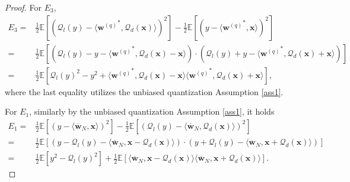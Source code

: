 \documentclass[11pt, letterpaper]{article}
\begin{document}
\begin{proof}
    For $E_3$,
    \begin{equation*}
        \begin{aligned}
            E_3=&\frac{1}{2}\mathbb{E}\left[(\mathcal{Q}_l(y)-\langle {\mathbf{w}^{(q)}}^*,\mathcal{Q}_d(\mathbf{x})\rangle)^2\right]-\frac{1}{2}\mathbb{E}\left[\left(y-\langle {\mathbf{w}^{(q)}}^*,\mathbf{x} \rangle \right)^2\right]\\
            =&\frac{1}{2}\mathbb{E}\left[\left(\mathcal{Q}_l(y)-y-\langle {\mathbf{w}^{(q)}}^*,\mathcal{Q}_d(\mathbf{x})-\mathbf{x}\rangle\right)\cdot \left(\mathcal{Q}_l(y)+y-\langle {\mathbf{w}^{(q)}}^*,\mathcal{Q}_d(\mathbf{x})+\mathbf{x}\rangle\right)\right]\\
            =&\frac{1}{2}\mathbb{E}\left[\mathcal{Q}_l(y)^2-y^2+\langle {\mathbf{w}^{(q)}}^*,\mathcal{Q}_d(\mathbf{x})-\mathbf{x}\rangle\langle {\mathbf{w}^{(q)}}^*,\mathcal{Q}_d(\mathbf{x})+\mathbf{x}\rangle\right],
        \end{aligned}
    \end{equation*}
    where the last equality utilizes the unbiased quantization Assumption \ref{ass1}.

    For $E_1$, similarly by the unbiased quantization Assumption \ref{ass1}, it holds
    \begin{equation*}
        \begin{aligned}
            E_1=&\frac{1}{2}\mathbb{E}\left[\left(y-\langle \overline{\mathbf{w}}_N,\mathbf{x} \rangle \right)^2\right]-\frac{1}{2}\mathbb{E}\left[(\mathcal{Q}_l(y)-\langle \overline{\mathbf{w}}_N,\mathcal{Q}_d(\mathbf{x})\rangle)^2\right]\\
            =&\frac{1}{2}\mathbb{E}\left[\left(y-\mathcal{Q}_l(y)-\langle \overline{\mathbf{w}}_N ,\mathbf{x}-\mathcal{Q}_d(\mathbf{x}) \rangle\right)\cdot \left(y+\mathcal{Q}_l(y)-\langle \overline{\mathbf{w}}_N ,\mathbf{x}+\mathcal{Q}_d(\mathbf{x}) \rangle\right) \right]\\
            =&\frac{1}{2}\mathbb{E}\left[y^2-\mathcal{Q}_l(y)^2\right]+\frac{1}{2}\mathbb{E}\left[\langle \overline{\mathbf{w}}_N ,\mathbf{x}-\mathcal{Q}_d(\mathbf{x}) \rangle\langle \overline{\mathbf{w}}_N ,\mathbf{x}+\mathcal{Q}_d(\mathbf{x}) \rangle\right].
        \end{aligned}
    \end{equation*}


\end{proof}
\end{document}
